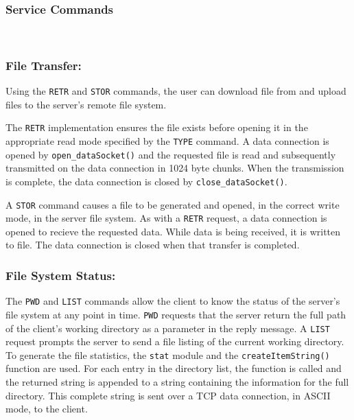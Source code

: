 \documentclass[10pt,twocolumn]{witseiepaper}
\begin{document}
\vspace*{-2mm}
\subsubsection{Service Commands} $    $

\vspace*{-2mm}
\subsubsection*{File Transfer:}
Using the \texttt{RETR} and \texttt{STOR} commands, the user can download file from and upload files to the server's remote file system. 

The \texttt{RETR} implementation ensures the file exists before opening it in the appropriate read mode specified by the \texttt{TYPE} command. A data connection is opened by \texttt{open\_dataSocket()} and the requested file is read and subsequently transmitted on the data connection in 1024 byte chunks. When the transmission is complete, the data connection is closed by \texttt{close\_dataSocket()}.

A \texttt{STOR} command causes a file to be generated and opened, in the correct write mode, in the server file system. As with a \texttt{RETR} request, a data connection is opened to recieve the requested data. While data is being received, it is written to file. The data connection is closed when that transfer is completed.

\vspace*{-2mm}
\subsubsection*{File System Status: }
The \texttt{PWD} and \texttt{LIST} commands allow the client to know the status of the server's file system at any point in time. \texttt{PWD} requests that the server return the full path of the client's working directory as a parameter in the reply message. A \texttt{LIST} request prompts the server to send a file listing of the current working directory. To generate the file statistics, the \texttt{stat} module and the \texttt{createItemString()} function are used. For each entry in the directory list, the function is called and the returned string is appended to a string containing the information for the full directory. This complete string is sent over a TCP data connection, in ASCII mode, to the client. 

\vspace*{-2mm}
\end{document}

